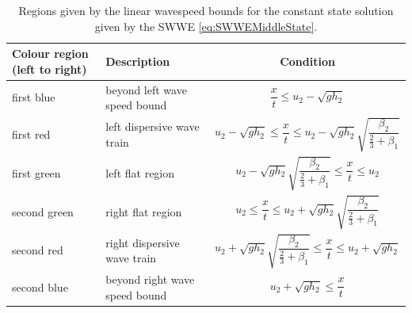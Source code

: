 \documentclass[10pt]{elsarticle}
\newcommand\T{\rule{0pt}{3ex }}       %
\begin{document}
%
\begin{table}
	\centering
	\begin{tabular}{l | l | c}
		\T Colour region (left to right) & Description & Condition \\
		\hline
		\T first blue & beyond left wave speed bound &$\dfrac{x}{t} \le u_{2} - \sqrt{g h_{2}} $ \\
		\T first red & left dispersive wave train  & $  u_{2} - \sqrt{g h_{2}} \le \dfrac{x}{t} \le u_{2} - \sqrt{gh_{2}} \sqrt{\dfrac{\beta_2}{\frac{2}{3} + \beta_1}}$ \\
		\T first green & left flat region & $u_{2} - \sqrt{gh_{2}} \sqrt{\dfrac{\beta_2}{\frac{2}{3} + \beta_1}} \le \dfrac{x}{t} \le u_{2}$ \\
		\T second green & right flat region & $u_{2} \le \dfrac{x}{t}\le u_{2} + \sqrt{gh_{2}} \sqrt{\dfrac{\beta_2}{\frac{2}{3} + \beta_1}}$ \\
		\T second red & right dispersive wave train & $  u_{2} + \sqrt{gh_{2}} \sqrt{\dfrac{\beta_2}{\frac{2}{3} + \beta_1}} \le \dfrac{x}{t} \le  u_{2} + \sqrt{g h_{2}} $ \\
		\T second blue & beyond right wave speed bound & $u_{2} +  \sqrt{g h_{2}} \le \dfrac{x}{t} $ 	
	\end{tabular}
	\caption{Regions given by the linear wavespeed bounds for the constant state solution given by the SWWE \eqref{eq:SWWEMiddleState}.  	\label{tab:rSWWE_LinearWaveSpeed}  }
\end{table}
\end{document}
